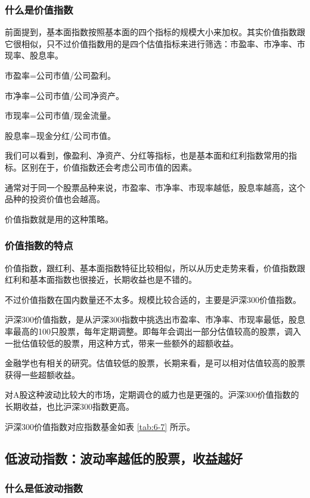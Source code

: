 \subsubsection{什么是价值指数}

前面提到，基本面指数按照基本面的四个指标的规模大小来加权。其实价值指数跟它很相似，只不过价值指数用的是四个估值指标来进行筛选：市盈率、市净率、市现率、股息率。

{\kaishu 市盈率=公司市值/公司盈利。}

{\kaishu 市净率=公司市值/公司净资产。}

{\kaishu 市现率=公司市值/现金流量。}

{\kaishu 股息率=现金分红/公司市值。}

我们可以看到，像盈利、净资产、分红等指标，也是基本面和红利指数常用的指标。区别在于，价值指数还会考虑公司市值的因素。

通常对于同一个股票品种来说，市盈率、市净率、市现率越低，股息率越高，这个品种的投资价值也会越高。

价值指数就是用的这种策略。

\subsubsection{价值指数的特点}

价值指数，跟红利、基本面指数特征比较相似，所以从历史走势来看，价值指数跟红利和基本面指数也很接近，长期收益也是不错的。

不过价值指数在国内数量还不太多。规模比较合适的，主要是沪深300价值指数。

沪深300价值指数，是从沪深300指数中挑选出市盈率、市净率、市现率最低，股息率最高的100只股票，每年定期调整。即每年会调出一部分估值较高的股票，调入一批估值较低的股票，用这种方式，带来一些额外的超额收益。

金融学也有相关的研究。估值较低的股票，长期来看，是可以相对估值较高的股票获得一些超额收益。

对A股这种波动比较大的市场，定期调仓的威力也是更强的。沪深300价值指数的长期收益，也比沪深300指数更高。

沪深300价值指数对应指数基金如表 \ref{tab:6-7} 所示。



\subsection{低波动指数：波动率越低的股票，收益越好}

\subsubsection{什么是低波动指数}

